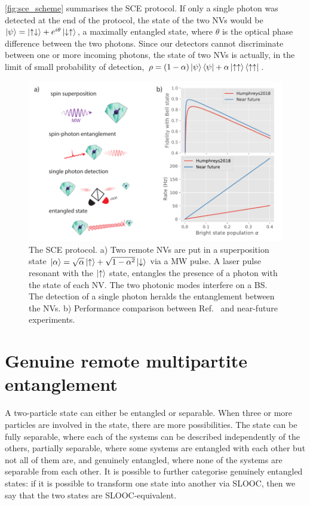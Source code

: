 \documentclass[a4paper, twoside]{article}
\begin{document}
\autoref{fig:sce_scheme} summarises the \ac{SCE} protocol. If only a single photon was detected at the end of the protocol, the state of the two \acp{NV} would be $\ket\psi = \ket{\uparrow\downarrow} + e^{i\theta}\ket{\downarrow\uparrow}$, a maximally entangled state, where $\theta$ is the optical phase difference between the two photons. Since our detectors cannot discriminate between one or more incoming photons, the state of two \acp{NV} is actually, in the limit of small probability of detection, $\rho = (1-\alpha)\ket\psi\bra\psi + \alpha\ket{\uparrow\uparrow}\bra{\uparrow\uparrow}$.

\begin{figure}
	\includegraphics[width=\textwidth]{images/figure2}
	\caption{The \acf{SCE} protocol.
	a) Two remote \acp{NV} are put in a superposition state $\ket\alpha = \sqrt\alpha\ket\uparrow + \sqrt{1-\alpha^2}\ket\downarrow$ via a \ac{MW} pulse.
	A laser pulse resonant with the $\ket\uparrow$ state, entangles the presence of a photon with the state of each \ac{NV}.
	The two photonic modes interfere on a \ac{BS}.
	The detection of a single photon heralds the entanglement between the \acp{NV}.
	b) Performance comparison between Ref.~\cite{Humphreys2018} and near-future experiments.}
	\label{fig:sce_scheme}
\end{figure}

\section{Genuine remote multipartite entanglement}
\label{sec:multipartite}
A two-particle state can either be entangled or separable. When three or more particles are involved in the state, there are more possibilities. The state can be fully separable, where each of the systems can be described independently of the others, partially separable, where some systems are entangled with each other but not all of them are, and genuinely entangled, where none of the systems are separable from each other.
It is possible to further categorise genuinely entangled states: if it is possible to transform one state into another via \ac{SLOOC}, then we say that the two states are \ac{SLOOC}-equivalent.
\end{document}
